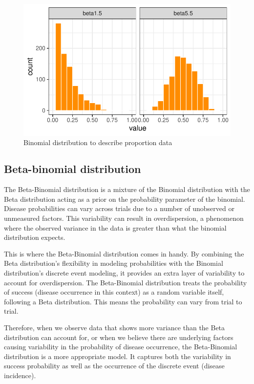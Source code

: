 \documentclass[
  letterpaper,
  DIV=11,
  numbers=noendperiod]{scrreprt}
\begin{document}
\begin{figure}[H]

{\centering \includegraphics{data-terminology_files/figure-pdf/fig-betabin-1.pdf}

}

\caption{\label{fig-betabin}Binomial distribution to describe proportion
data}

\end{figure}

\hypertarget{beta-binomial-distribution}{%
\subsection{Beta-binomial
distribution}\label{beta-binomial-distribution}}

The Beta-Binomial distribution is a mixture of the Binomial distribution
with the Beta distribution acting as a prior on the probability
parameter of the binomial. Disease probabilities can vary across trials
due to a number of unobserved or unmeasured factors. This variability
can result in overdispersion, a phenomenon where the observed variance
in the data is greater than what the binomial distribution expects.

This is where the Beta-Binomial distribution comes in handy. By
combining the Beta distribution's flexibility in modeling probabilities
with the Binomial distribution's discrete event modeling, it provides an
extra layer of variability to account for overdispersion. The
Beta-Binomial distribution treats the probability of success (disease
occurrence in this context) as a random variable itself, following a
Beta distribution. This means the probability can vary from trial to
trial.

Therefore, when we observe data that shows more variance than the Beta
distribution can account for, or when we believe there are underlying
factors causing variability in the probability of disease occurrence,
the Beta-Binomial distribution is a more appropriate model. It captures
both the variability in success probability as well as the occurrence of
the discrete event (disease incidence).
\end{document}
